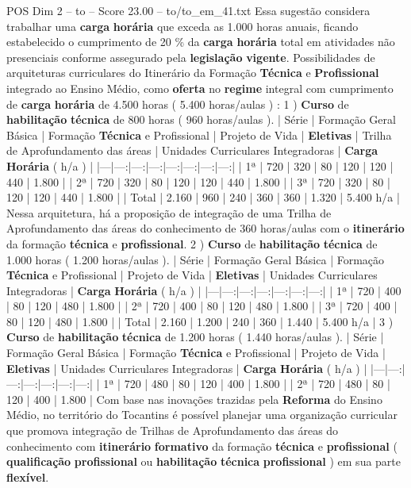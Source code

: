 \begin{textsample}{POS Dim 2 – to – Score 23.00 – to/to\_em\_41.txt}
Essa sugestão considera trabalhar uma \textbf{carga} \textbf{horária} que exceda as 1.000 horas anuais, ficando estabelecido o cumprimento de 20 \% da \textbf{carga} \textbf{horária} total em atividades não presenciais conforme assegurado pela \textbf{legislação} \textbf{vigente}.
Possibilidades de arquiteturas curriculares do Itinerário da Formação \textbf{Técnica} e \textbf{Profissional} integrado ao Ensino Médio, como \textbf{oferta} no \textbf{regime} integral com cumprimento de \textbf{carga} \textbf{horária} de 4.500 horas ( 5.400 horas/aulas ) : 1 ) \textbf{Curso} de \textbf{habilitação} \textbf{técnica} de 800 horas ( 960 horas/aulas ). | Série | Formação Geral Básica | Formação \textbf{Técnica} e Profissional | Projeto de Vida | \textbf{Eletivas} | Trilha de Aprofundamento das áreas | Unidades Curriculares Integradoras | \textbf{Carga} \textbf{Horária} ( h/a ) | |---|---:|---:|---:|---:|---:|---:|---:| | 1ª | 720 | 320 | 80 | 120 | 120 | 440 | 1.800 | | 2ª | 720 | 320 | 80 | 120 | 120 | 440 | 1.800 | | 3ª | 720 | 320 | 80 | 120 | 120 | 440 | 1.800 | | Total | 2.160 | 960 | 240 | 360 | 360 | 1.320 | 5.400 h/a | Nessa arquitetura, há a proposição de integração de uma Trilha de Aprofundamento das áreas do conhecimento de 360 horas/aulas com o \textbf{itinerário} da formação \textbf{técnica} e \textbf{profissional}. 2 ) \textbf{Curso} de \textbf{habilitação} \textbf{técnica} de 1.000 horas ( 1.200 horas/aulas ). | Série | Formação Geral Básica | Formação \textbf{Técnica} e Profissional | Projeto de Vida | \textbf{Eletivas} | Unidades Curriculares Integradoras | \textbf{Carga} \textbf{Horária} ( h/a ) | |---|---:|---:|---:|---:|---:|---:| | 1ª | 720 | 400 | 80 | 120 | 480 | 1.800 | | 2ª | 720 | 400 | 80 | 120 | 480 | 1.800 | | 3ª | 720 | 400 | 80 | 120 | 480 | 1.800 | | Total | 2.160 | 1.200 | 240 | 360 | 1.440 | 5.400 h/a | 3 ) \textbf{Curso} de \textbf{habilitação} \textbf{técnica} de 1.200 horas ( 1.440 horas/aulas ). | Série | Formação Geral Básica | Formação \textbf{Técnica} e Profissional | Projeto de Vida | \textbf{Eletivas} | Unidades Curriculares Integradoras | \textbf{Carga} \textbf{Horária} ( h/a ) | |---|---:|---:|---:|---:|---:|---:| | 1ª | 720 | 480 | 80 | 120 | 400 | 1.800 | | 2ª | 720 | 480 | 80 | 120 | 400 | 1.800 | Com base nas inovações trazidas pela \textbf{Reforma} do Ensino Médio, no território do Tocantins é possível planejar uma organização curricular que promova integração de Trilhas de Aprofundamento das áreas do conhecimento com \textbf{itinerário} \textbf{formativo} da formação \textbf{técnica} e \textbf{profissional} ( \textbf{qualificação} \textbf{profissional} ou \textbf{habilitação} \textbf{técnica} \textbf{profissional} ) em sua parte \textbf{flexível}.

\end{textsample}
